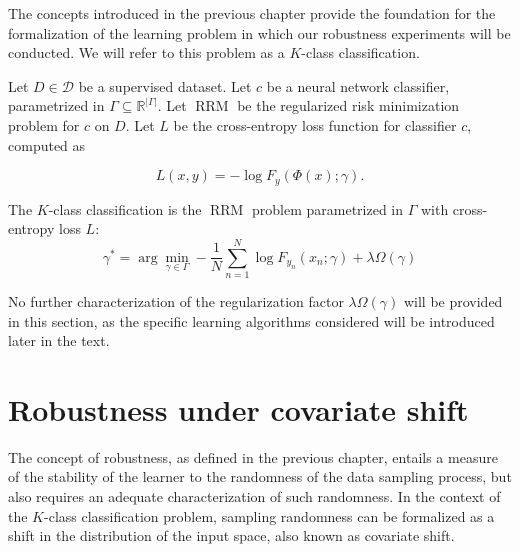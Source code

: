 The concepts introduced in the previous chapter provide the 
foundation for the formalization of the learning problem in which our 
robustness experiments will be conducted. We will refer to this 
problem as a $K$-class classification.

\begin{definition}
    Let $D \in \mathcal{D}$ be a supervised dataset.
    Let $c$ be a neural network classifier, parametrized
    in $\Gamma \subseteq \mathbb{R}^{|\Gamma|}$.
    Let $\operatorname{RRM}$ be the regularized risk minimization problem for $c$ on $D$.
    Let $L$ be the cross-entropy loss function for classifier $c$, computed as

    $$
    L(x, y) = - \log F_y(\Phi(x); \gamma).
    $$

    The $K$-class classification is the $\operatorname{RRM}$ problem parametrized in $\Gamma$
    with cross-entropy loss $L$:
    $$
        \gamma^* = \arg \min_{\gamma \in \Gamma} - \frac{1}{N}\sum_{n=1}^{N} \log F_{y_n}(x_n; \gamma) + \lambda \Omega(\gamma)
    $$

\end{definition}

No further characterization of the regularization factor $\lambda \Omega(\gamma)$ will be provided
in this section, as the specific learning algorithms considered will be introduced
later in the text.

\section{Robustness under covariate shift}\label{sec:robustness_to_covariate_shift}

The concept of robustness, as defined in the previous chapter, entails
a measure of the stability of the learner to the randomness of
the data sampling process, but also requires an adequate characterization
of such randomness. In the context of the $K$-class classification
problem, sampling randomness can be formalized as a shift in the
distribution of the input space, also known as covariate shift. 

